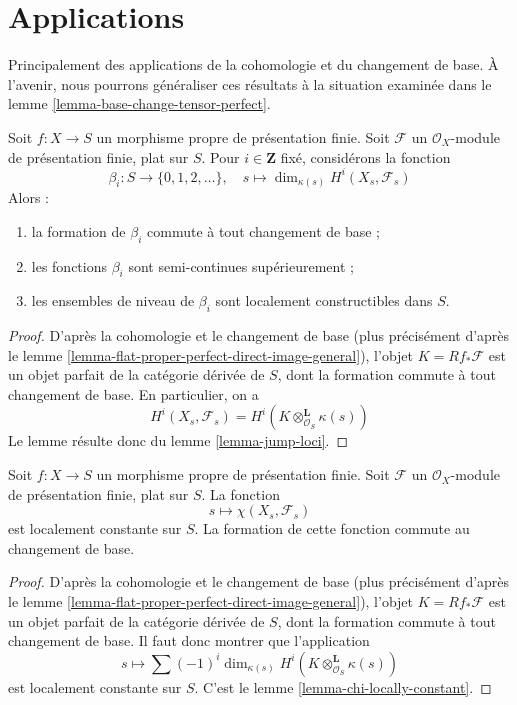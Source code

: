 \section{Applications}
\label{section-applications}

\noindent
Principalement des applications de la cohomologie et du changement de base. À l'avenir, nous pourrons
généraliser ces résultats à la situation examinée dans le
lemme \ref{lemma-base-change-tensor-perfect}.

\begin{lemma}
\label{lemma-jump-loci-geometric}
Soit $f : X \to S$ un morphisme propre de présentation finie.
Soit $\mathcal{F}$ un $\mathcal{O}_X$-module de présentation finie,
plat sur $S$. Pour $i \in \mathbf{Z}$ fixé, considérons la fonction
$$
\beta_i : S \to \{0, 1, 2, \ldots\},\quad
s \longmapsto \dim_{\kappa(s)} H^i(X_s, \mathcal{F}_s)
$$
Alors :
\begin{enumerate}
\item la formation de $\beta_i$ commute à tout changement de base ;
\item les fonctions $\beta_i$ sont semi-continues supérieurement ;
\item les ensembles de niveau de $\beta_i$ sont localement constructibles dans $S$.
\end{enumerate}
\end{lemma}

\begin{proof}
D'après la cohomologie et le changement de base (plus précisément d'après le
lemme \ref{lemma-flat-proper-perfect-direct-image-general}),
l'objet $K = Rf_*\mathcal{F}$ est un objet parfait de la catégorie dérivée
de $S$, dont la formation commute à tout changement de base.
En particulier, on a
$$
H^i(X_s, \mathcal{F}_s) = H^i(K \otimes_{\mathcal{O}_S}^\mathbf{L} \kappa(s))
$$
Le lemme résulte donc du
lemme \ref{lemma-jump-loci}.
\end{proof}

\begin{lemma}
\label{lemma-chi-locally-constant-geometric}
Soit $f : X \to S$ un morphisme propre de présentation finie.
Soit $\mathcal{F}$ un $\mathcal{O}_X$-module de présentation finie,
plat sur $S$. La fonction
$$
s \longmapsto \chi(X_s, \mathcal{F}_s)
$$
est localement constante sur $S$. La formation de cette fonction commute au
changement de base.
\end{lemma}

\begin{proof}
D'après la cohomologie et le changement de base (plus précisément d'après le
lemme \ref{lemma-flat-proper-perfect-direct-image-general}),
l'objet $K = Rf_*\mathcal{F}$ est un objet parfait de la catégorie dérivée
de $S$, dont la formation commute à tout changement de base.
Il faut donc montrer que l'application
$$
s \longmapsto \sum (-1)^i \dim_{\kappa(s)}
H^i(K \otimes^\mathbf{L}_{\mathcal{O}_S} \kappa(s))
$$
est localement constante sur $S$. C'est le lemme \ref{lemma-chi-locally-constant}.
\end{proof}

